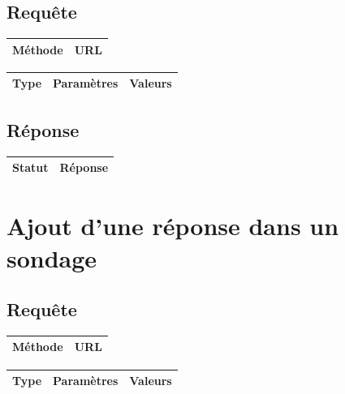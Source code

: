 \documentclass[titlepage]{report}
\begin{document}
\section{Requête}

\begin{center}
	\begin{tabular}{|c|c|}
		\hline
		Méthode & URL \\
		\hline
		
	\end{tabular}
\end{center}


\begin{center}
	\begin{tabular}{|c|c|c|}
		\hline
		Type & Paramètres & Valeurs \\
		\hline
		
	\end{tabular}
\end{center}


\section{Réponse}

\begin{center}
	\begin{tabular}{|c|c|}
		\hline
		Statut & Réponse \\
		\hline
		
	\end{tabular}
\end{center}

\chapter{Ajout d'une réponse dans un sondage}

\section{Requête}

\begin{center}
	\begin{tabular}{|c|c|}
		\hline
		Méthode & URL \\
		\hline
		
	\end{tabular}
\end{center}


\begin{center}
	\begin{tabular}{|c|c|c|}
		\hline
		Type & Paramètres & Valeurs \\
		\hline
		
	\end{tabular}
\end{center}
\end{document}
